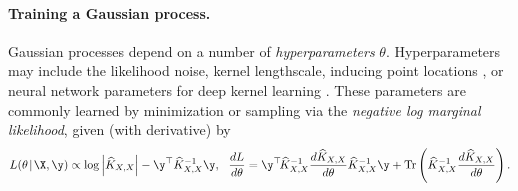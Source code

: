 \paragraph{Training a Gaussian process.}
Gaussian processes depend on a number of \emph{hyperparameters} $\theta$. Hyperparameters may include the likelihood noise, kernel lengthscale, inducing point locations \cite{titsias2009variational}, or neural network parameters for deep kernel learning \cite{wilson2016deep}. These parameters are commonly learned by minimization or sampling via the \emph{negative log marginal likelihood}, given (with derivative) by
%
\begin{equation}
  L(\theta \! \mid \! \X, \y) \propto \log \left\vert \trainK \right\vert - \y^{\top}\trainK^{-1}\y,
  \:\:\:
  \frac{dL}{d\theta} = \y^{\top} \! \trainK^{-1}\frac{d\trainK}{d\theta}\trainK^{-1}\y + \tr{\trainK^{-1}\frac{d\trainK}{d\theta}} \label{eq:log_lik_and_deriv}.
\end{equation}
